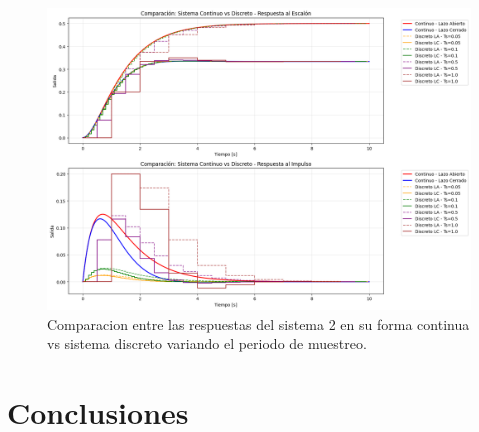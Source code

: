 \documentclass[journal]{IEEEtran}
\begin{document}
\begin{figure}[h!]
    \centering
    \includegraphics[width=1\linewidth]{Comparacion_P5.png}
    \caption{Comparacion entre las respuestas del sistema 2 en su forma continua vs sistema discreto variando el periodo de muestreo.}
    \label{fig:simulacion_P5}
\end{figure}


\section{Conclusiones}


\end{document}
